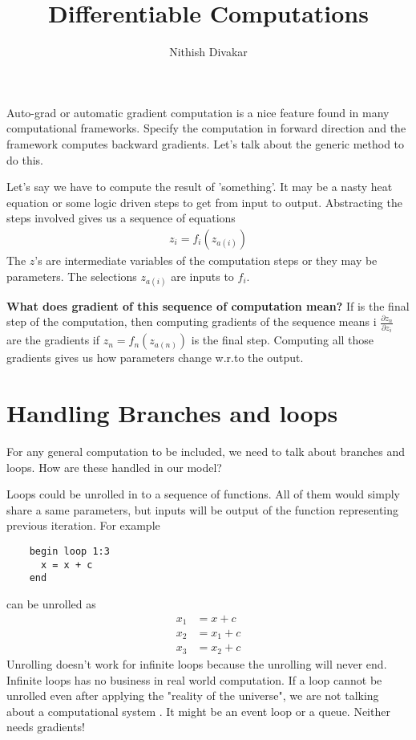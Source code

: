 \documentclass[12pt,crop=false,class=article,convert={density=300,outext=.compiled.png}]{standalone}
\title{\Huge Differentiable Computations}
\date{}
\author{Nithish Divakar}
\begin{document}
\maketitle



Auto-grad or automatic gradient computation is a nice feature found in many computational frameworks.
Specify the computation in forward direction and the framework computes
backward gradients. Let's talk about the generic method to do this.

Let's say we have to compute the result of 'something'. It may be a
nasty heat equation or some logic driven steps to get from input to
output. Abstracting the steps involved gives us a sequence of equations
\begin{align*}
  z_i = f_i(z_{a(i)})
\end{align*}
%
The $z$'s are intermediate variables of the computation steps or they may be parameters. The selections $z_{a(i)}$ are inputs to $f_i$.

\textbf{What does gradient of this sequence of computation mean?}
%
If is the final step of the computation, then computing gradients of the
sequence means i $\frac{\partial z_n}{\partial z_i}$ are the gradients if $z_n=f_n(z_{a(n)})$ is the final step. Computing all those gradients gives us how parameters change w.r.to the output.

\section*{Handling Branches and loops}
For any general computation to be included, we need to talk about
branches and loops. How are these handled in our model?

Loops could be unrolled in to a sequence of functions. All of them would
simply share a same parameters, but inputs will be output of the
function representing previous iteration. For example
%
\begin{verbatim}
    begin loop 1:3
      x = x + c
    end
\end{verbatim}
%
can be unrolled as
%
\begin{align*}
  x_1 &= x + c
\\x_2 &= x_1 + c
\\x_3 &= x_2 + c
\end{align*}
Unrolling doesn't work for infinite loops because the unrolling will never end.
Infinite loops has no business in real world computation. If a loop
cannot be unrolled even after applying the "reality of the universe", we
are not talking about a computational system . It might be an event loop
or a queue. Neither needs gradients!
\end{document}
